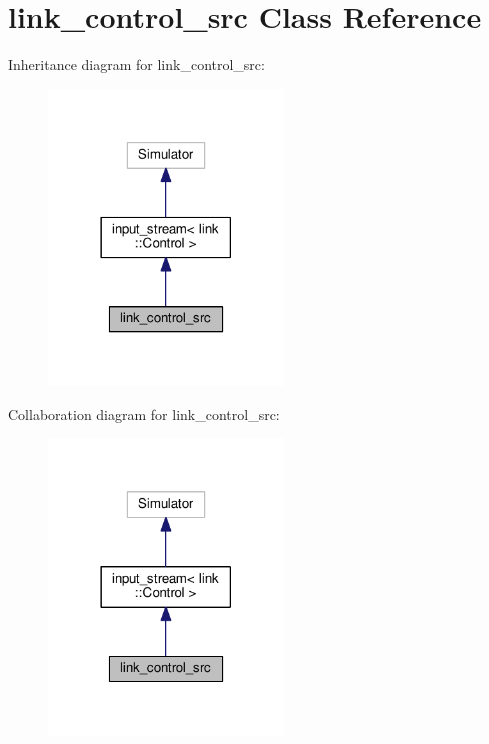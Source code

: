 \hypertarget{classlink__control__src}{}\section{link\+\_\+control\+\_\+src Class Reference}
\label{classlink__control__src}


Inheritance diagram for link\+\_\+control\+\_\+src\+:\nopagebreak
\begin{figure}[H]
\begin{center}
\leavevmode
\includegraphics[width=177pt]{classlink__control__src__inherit__graph}
\end{center}
\end{figure}


Collaboration diagram for link\+\_\+control\+\_\+src\+:\nopagebreak
\begin{figure}[H]
\begin{center}
\leavevmode
\includegraphics[width=177pt]{classlink__control__src__coll__graph}
\end{center}
\end{figure}
